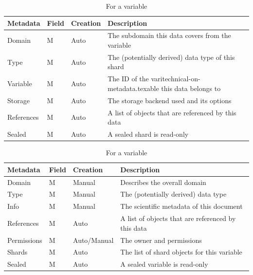 \begin{table}
	\begin{subtable}[t]{\textwidth}
		\begin{tabular}{llll}
			Metadata & Field & Creation & Description\\
			\hline
			Domain   & M & Auto & The subdomain this data covers from the variable\\
			Type     & M & Auto & The (potentially derived) data type of this shard\\
			Variable & M & Auto & The ID of the varitechnical-on-metadata.texable this data belongs to\\
			Storage  & M & Auto & The storage backend used and its options\\
			References & M & Auto & A list of objects that are referenced by this data\\
			Sealed   & M & Auto & A sealed shard is read-only\\
		\end{tabular}
		\caption{For a shard}
	\end{subtable}

	\begin{subtable}[t]{\textwidth}
		\begin{tabular}{llll}
			Metadata & Field & Creation & Description\\
			\hline
			Domain      & M & Manual & Describes the overall domain\\
			Type   	    & M & Manual & The (potentially derived) data type\\
			Info   	    & M & Manual & The scientific metadata of this document\\
			References  & M & Auto & A list of objects that are referenced by this data\\
			Permissions & M & Auto/Manual & The owner and permissions \\
			Shards      & M & Auto & The list of shard objects for this variable\\
			Sealed      & M & Auto & A sealed variable is read-only\\
		\end{tabular}
		\caption{For a variable}
	\end{subtable}



\end{table}

